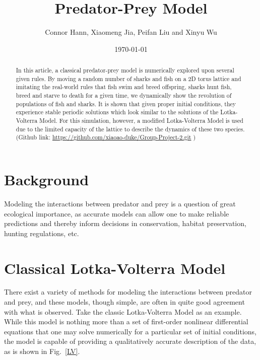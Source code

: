 \documentclass[aps,prl,preprint,superscriptaddress]{revtex4}
\begin{document}
	
	
	\title{Predator-Prey Model}%
	
	\author{Connor Hann, Xiaomeng Jia, Peifan Liu and Xinyu Wu}
	
	
	\date{\today}
	
	\begin{abstract}
	In this article, a classical predator-prey model is numerically explored upon several given rules. By moving a random number of sharks and fish on a 2D torus lattice and imitating the real-world rules that fish swim and breed offspring, sharks hunt fish, breed and starve to death for a given time, we dynamically show the revolution of populations of fish and sharks. It is shown that given proper initial conditions, they experience stable periodic solutions which look similar to the solutions of the Lotka-Volterra Model. For this simulation, however, a modified Lotka-Volterra Model is used due to the limited capacity of the lattice to describe the dynamics of these two species. (Github link: \href{https://github.com/xiaoao-duke/Group-Project-2.git}{https://github.com/xiaoao-duke/Group-Project-2.git} )
	\end{abstract}
	
	\maketitle
	
	
	
	\section{Background} 
Modeling the interactions between predator and prey is a question of great ecological importance, as accurate models can allow one to make reliable predictions and thereby inform decisions in conservation, habitat preservation, hunting regulations, etc. 
\section{Classical Lotka-Volterra Model}	
There exist a variety of methods for modeling the interactions between predator and prey, and these models, though simple, are often in quite good agreement with what is observed. Take the classic Lotka-Volterra Model as an example. While this model is nothing more than a set of first-order nonlinear differential equations that one may solve numerically for a particular set of initial conditions, the model is capable of providing a qualitatively accurate description of the data, as is shown in Fig.~\ref{LV}. 
\end{document}
